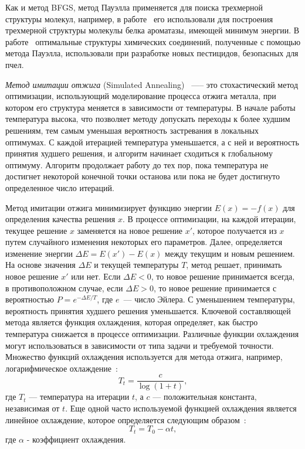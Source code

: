 Как и метод BFGS, метод Пауэлла применяется для поиска трехмерной структуры молекул, например, в работе~\cite{loge2005three} его использовали для построения трехмерной структуры молекулы белка ароматазы, имеющей минимум энергии.
В работе~\cite{zhao2019design} оптимальные структуры химических соединений, полученные с помощью метода Пауэлла, использовали при разработке новых пестицидов, безопасных для пчел.




\emph{Метод имитации отжига} (Simulated Annealing)~\cite{metropolis1953equation,kirkpatrick1983optimization} ----- это стохастический метод оптимизации, использующий моделирование процесса отжига металла, при котором его структура меняется в зависимости от температуры.
В начале работы температура высока, что позволяет методу допускать переходы к более худшим решениям, тем самым уменьшая вероятность застревания в локальных оптимумах.
С каждой итерацией температура уменьшается, а с ней и вероятность принятия худшего решения, и алгоритм начинает сходиться к глобальному оптимуму.
Алгоритм продолжает работу до тех пор, пока температура не достигнет некоторой конечной точки останова или пока не будет достигнуто определенное число итераций.

Метод имитации отжига минимизирует функцию энергии $E(x) = -f(x)$ для определения качества решения $x$.
В процессе оптимизации, на каждой итерации, текущее решение $x$ заменяется на новое решение $x'$, которое получается из $x$ путем случайного изменения некоторых его параметров.
Далее, определяется изменение энергии $\Delta E=E(x')-E(x)$ между текущим и новым решением.
На основе значения $\Delta E$ и текущей температуры $T$, метод решает, принимать новое решение $x'$ или нет.
Если $\Delta E<0$, то новое решение принимается всегда, в противоположном случае, если $\Delta E>0$, то новое решение принимается с вероятностью $P=e^{-\Delta E/T}$, где $e$~--- число Эйлера.
С уменьшением температуры, вероятность принятия худшего решения уменьшается.
Ключевой составляющей метода является функция охлаждения, которая определяет, как быстро температура снижается в процессе оптимизации. Различные функции охлаждения могут использоваться в зависимости от типа задачи и требуемой точности.
Множество функций охлаждения используется для метода отжига, например, логарифмическое охлаждение~\cite{mahdi2017performance}:
$$T_{t} = \frac{c}{\log(1+t)},$$
где $T_{t}$ --- температура на итерации $t$, а $c$ --- положительная константа, независимая от $t$.
Еще одной часто используемой функцией охлаждения является линейное охлаждение, которое определяется следующим образом~\cite{mahdi2017performance}:
$$T_{t} = T_0 - \alpha t,$$
где $\alpha$ - коэффициент охлаждения.


